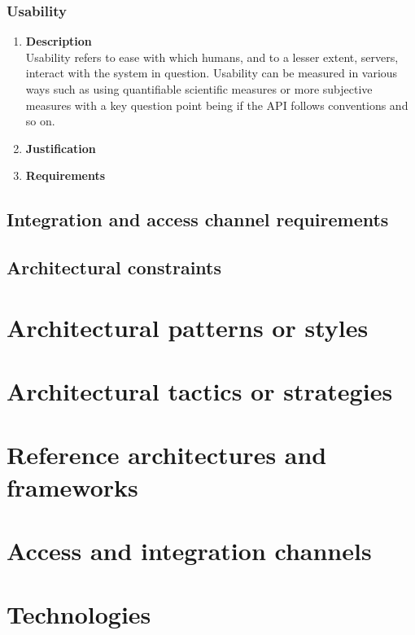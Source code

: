 \documentclass[a4paper,10pt]{article}
\begin{document}
	\subsubsection{Usability}
		\begin{enumerate}
			\item \textbf{Description} \\
				Usability refers to ease with which humans, and to a lesser extent, servers, interact with the system in question. Usability can be measured in various ways such as using quantifiable scientific measures or more subjective measures with a key question point being if the API follows conventions and so on.

			\item \textbf{Justification} \\
			\item \textbf{Requirements}\\
		\end{enumerate}

\subsection{Integration and access channel requirements}
\subsection{Architectural constraints}

\section{Architectural patterns or styles}

\section{Architectural tactics or strategies}
 
\section{Reference architectures and frameworks}
 
\section{Access and integration channels}

\section{Technologies}
\end{document}
